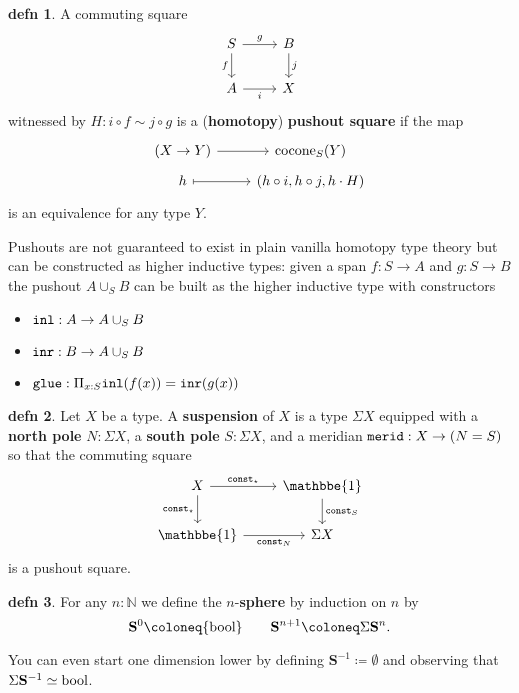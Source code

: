 \documentclass{amsart}
\theoremstyle{theorem}
\theoremstyle{definition}
\newtheorem*{defn}{defn}
\theoremstyle{remark}
\newcommand{\0}{\mathbbe{0}}
\newcommand{\1}{\mathbbe{1}}
\newcommand{\2}{\mathbbe{2}}
\newcommand{\3}{\mathbbe{3}}
\newcommand{\4}{\mathbbe{4}}
\newcommand{\NN}{\mathbb{N}}
\newcommand{\term}[1]{{\textup{\texttt{#1}}}}
\newcommand{\type}[1]{{\textup{#1}}}
\newcommand{\inl}{\term{inl}}
\newcommand{\inr}{\term{inr}}
\newcommand{\const}{\term{const}}
\newcommand{\glue}{\term{glue}}
\newcommand{\bool}{\type{bool}}
\newcommand{\Sn}[1]{\mathbf{S}^{#1}}
\begin{document}
\begin{defn} A commuting square
\[
\begin{tikzcd} S \arrow[d, "f"'] \arrow[r, "g"] & B \arrow[d, "j"] \\ A \arrow[r, "i"'] & X
\end{tikzcd}
\]
witnessed by $H : i \circ f \sim j \circ g$ is a (\textbf{homotopy}) \textbf{pushout square} if the map
\[ 
\begin{tikzcd}[row sep=tiny] (X \to Y) \arrow[r] & \type{cocone}_S(Y) \\ h \arrow[r, maps to] & (h \circ i, h \circ j, h \cdot H)
\end{tikzcd}
\]
is an equivalence for any type $Y$.
\end{defn}

Pushouts are not guaranteed to exist in plain vanilla homotopy type theory but can be constructed as higher inductive types: given a span $f \colon S \to A$ and $g \colon S \to B$ the pushout $A \cup_S B$ can be built as the higher inductive type with constructors
\begin{itemize}
\item $\inl : A \to A \cup_S B$
\item $\inr : B \to A \cup_S B$
\item $\glue : \Pi_{x :S} \inl(f(x)) = \inr(g(x))$
\end{itemize}



\begin{defn} Let $X$ be a type. A \textbf{suspension} of $X$ is a type $\Sigma X$ equipped with a \textbf{north pole} $N : \Sigma X$, a \textbf{south pole} $S : \Sigma X$, and a meridian $\term{merid} : X \to (N = S)$ so that the commuting square
\[
\begin{tikzcd} X \arrow[r, "\const_\star"] \arrow[d, "\const_\star"'] & \1 \arrow[d, "\const_S"] \\ \1 \arrow[r, "\const_N"'] & \Sigma X
\end{tikzcd}
\]
is a pushout square.
\end{defn}

\begin{defn} For any $n : \NN$ we define the $n$-\textbf{sphere} by induction on $n$ by
\[ \Sn{0} \coloneq \bool \qquad \Sn{n+1} \coloneq \Sigma \Sn{n}.\]
 \end{defn}
 
 You can even start one dimension lower by defining $\Sn{-1} \coloneq \emptyset$ and observing that $\Sigma\Sn{-1} \simeq \bool$.
\end{document}
